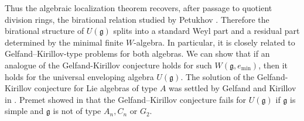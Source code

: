 \documentclass[12pt,a4paper]{amsart}
\numberwithin{equation}{section}
\theoremstyle{definition}
\theoremstyle{remark}
\newcommand{\g}{\mathfrak g}
\begin{document}
Thus the algebraic localization theorem recovers, after passage to
quotient division rings, the birational relation studied by Petukhov
\cite{Petukhov}.
Therefore the birational structure of $U(\mathfrak g)$ splits into a
standard Weyl part and a residual part determined by the minimal finite
$W$-algebra.  In particular, it is closely related to
Gelfand--Kirillov-type problems for both algebras.
We can show that if an analogue of the Gelfand-Kirillov conjecture
holds for such $W(\g,e_{\min})$, then it holds for the universal enveloping algebra $U(\g)$.
The solution of the  Gelfand-Kirillov conjecture for Lie algebras of type $A$  was
settled by Gelfand and Kirillov  in \cite{GK1}.
Premet showed in \cite{Pr3} that the Gelfand--Kirillov conjecture fails for $U(\g)$ if $\g$ is simple and $\g$ is
not of type $A_n, C_n$ or $G_2$.
\end{document}
